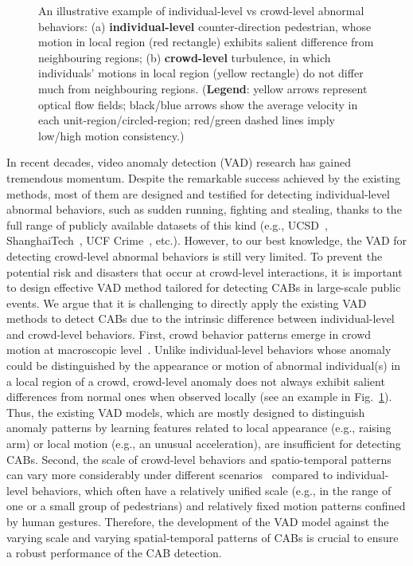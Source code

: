 \documentclass[journal]{IEEEtran}
\begin{document}
\begin{figure}[!t]
	\centering
	\hfil
	\caption{An illustrative example of individual-level vs crowd-level abnormal behaviors: (a) \textbf{individual-level} counter-direction pedestrian, whose motion in local region (red rectangle) exhibits salient difference from neighbouring regions; (b) \textbf{crowd-level} turbulence, in which individuals' motions in local region (yellow rectangle) do not differ much from neighbouring regions. (\textbf{Legend}: yellow arrows represent optical flow fields; black/blue arrows show the average velocity in each unit-region/circled-region; red/green dashed lines imply low/high motion consistency.)}
	\label{fig_sim}
\end{figure}

In recent decades, video anomaly detection (VAD) research has gained tremendous momentum. Despite the remarkable success achieved by the existing methods, most of them are designed and testified for detecting individual-level abnormal behaviors, such as sudden running, fighting and stealing, thanks to the full range of publicly available datasets of this kind (e.g., UCSD~\cite{mahadevan2010anomaly}, ShanghaiTech~\citep{liu2018future}, UCF Crime~\cite{sultani2018real}, etc.). However, to our best knowledge, the VAD for detecting crowd-level abnormal behaviors is still very limited. To prevent the potential risk and disasters that occur at crowd-level interactions, it is important to design effective VAD method tailored for detecting CABs in large-scale public events. We argue that it is challenging to directly apply the existing VAD methods to detect CABs due to the intrinsic difference between individual-level and crowd-level behaviors. First, crowd behavior patterns emerge in crowd motion at macroscopic level~\cite{helbing2013globally}. Unlike individual-level behaviors whose anomaly could be distinguished by the appearance or motion of abnormal individual(s) in a local region of a crowd, crowd-level anomaly does not always exhibit salient differences from normal ones when observed locally (see an example in Fig.~\ref{fig_sim}). Thus, the existing VAD models, which are mostly designed to distinguish anomaly patterns by learning features related to local appearance (e.g., raising arm) or local motion (e.g., an unusual acceleration), are insufficient for detecting CABs. Second, the scale of crowd-level behaviors and spatio-temporal  patterns can vary more considerably under different scenarios~\cite{solmaz2012identifying} compared to individual-level behaviors, which often have a relatively unified scale (e.g., in the range of one or a small group of pedestrians) and relatively fixed motion patterns confined by human gestures. Therefore, the development of the VAD model against the varying scale and varying spatial-temporal patterns of CABs is crucial to ensure a robust performance of the CAB detection.
\end{document}
